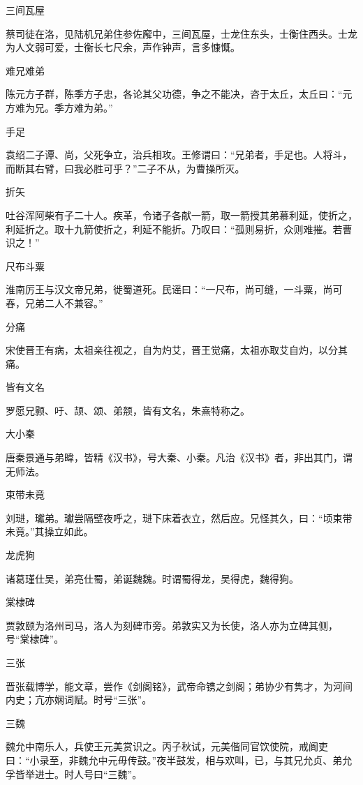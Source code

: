 \documentclass[a4paper,12pt,UTF8,twoside]{ctexbook}
\begin{document}
    三间瓦屋
    
    蔡司徒在洛，见陆机兄弟住参佐廨中，三间瓦屋，士龙住东头，士衡住西头。士龙为人文弱可爱，士衡长七尺余，声作钟声，言多慷慨。
    
    难兄难弟
    
    陈元方子群，陈季方子忠，各论其父功德，争之不能决，咨于太丘，太丘曰：“元方难为兄。季方难为弟。”
    
    手足
    
    袁绍二子谭、尚，父死争立，治兵相攻。王修谓曰：“兄弟者，手足也。人将斗，而断其右臂，曰我必胜可乎？”二子不从，为曹操所灭。
    
    折矢
    
    吐谷浑阿柴有子二十人。疾革，令诸子各献一箭，取一箭授其弟慕利延，使折之，利延折之。取十九箭使折之，利延不能折。乃叹曰：“孤则易折，众则难摧。若曹识之！”
    
    尺布斗粟
    
    淮南厉王与汉文帝兄弟，徙蜀道死。民谣曰：“一尺布，尚可缝，一斗粟，尚可舂，兄弟二人不兼容。”
    
    分痛
    
    宋使晋王有病，太祖亲往视之，自为灼艾，晋王觉痛，太祖亦取艾自灼，以分其痛。
    
    皆有文名
    
    罗愿兄颢、吁、颉、颂、弟颒，皆有文名，朱熹特称之。
    
    大小秦
    
    唐秦景通与弟暐，皆精《汉书》，号大秦、小秦。凡治《汉书》者，非出其门，谓无师法。
    
    束带未竟
    
    刘琎，瓛弟。瓛尝隔壁夜呼之，琎下床着衣立，然后应。兄怪其久，曰：“顷束带未竟。”其操立如此。
    
    龙虎狗
    
    诸葛瑾仕吴，弟亮仕蜀，弟诞魏魏。时谓蜀得龙，吴得虎，魏得狗。
    
    棠棣碑
    
    贾敦颐为洛州司马，洛人为刻碑市旁。弟敦实又为长使，洛人亦为立碑其侧，号“棠棣碑”。
    
    三张
    
    晋张载博学，能文章，尝作《剑阁铭》，武帝命镌之剑阁；弟协少有隽才，为河间内史；亢亦娴词赋。时号“三张”。
    
    三魏
    
    魏允中南乐人，兵使王元美赏识之。丙子秋试，元美偕同官饮使院，戒阍吏曰：“小录至，非魏允中元毋传鼓。”夜半鼓发，相与欢叫，已，与其兄允贞、弟允孚皆举进士。时人号曰“三魏”。
    
\end{document}
